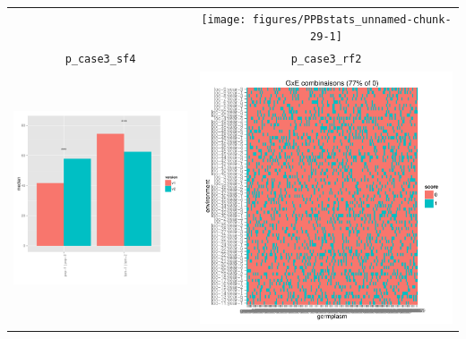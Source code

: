 \documentclass{article}\usepackage[]{graphicx}\usepackage[]{color}
\newenvironment{knitrout}{}{} %
\begin{document}
\begin{center}
\begin{tabular}{cc}
\begin{knitrout}
{}



\end{knitrout}
&
\begin{knitrout}
\definecolor{shadecolor}{rgb}{0.969, 0.969, 0.969}\color{fgcolor}

{\centering \texttt{[image: figures/PPBstats\_unnamed-chunk-29-1]} 

}



\end{knitrout}
\\
\texttt{p\_case3\_sf4} & \texttt{p\_case3\_rf2} \\
\begin{knitrout}
\definecolor{shadecolor}{rgb}{0.969, 0.969, 0.969}\color{fgcolor}

{\centering \includegraphics[width=.4\textwidth]{figures/PPBstats_unnamed-chunk-30-1} 

}



\end{knitrout}
&
\begin{knitrout}
\definecolor{shadecolor}{rgb}{0.969, 0.969, 0.969}\color{fgcolor}

{\centering \includegraphics[width=.4\textwidth]{figures/PPBstats_unnamed-chunk-31-1} 

}



\end{knitrout}
\\
\end{tabular}
\end{center}
\end{document}
